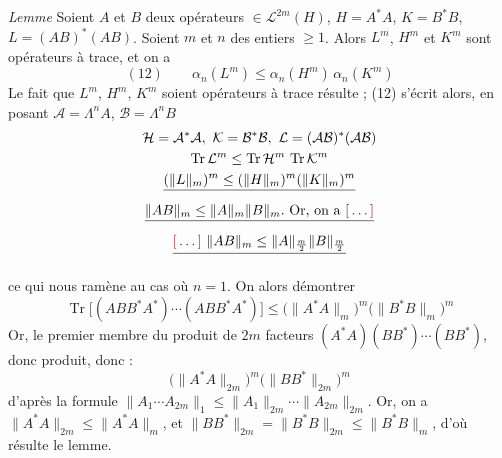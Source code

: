 \documentclass[11pt,a4paper]{article}
\begin{document}
\emph{Lemme} Soient $A$ et $B$ deux opérateurs $\in \mathcal{L}^{2m}(H)$,  $H = A^*A$, $K = B^*B$, $L = (AB)^*(AB)$. Soient  $m$ et $n$ des entiers $\geq 1$. Alors  $L^m$, $H^m$ et $K^m$  sont opérateurs à trace, et on a
\[
  (12)\qquad \alpha_n(L^m) \leq \alpha_n(H^m)\, \alpha_n(K^m)
\]
Le fait que $L^m$, $H^m$, $K^m$ soient opérateurs à trace résulte  \ill{}     ;    (12) s'écrit alors,  en posant $\mathcal{A} = \Lambda^n A$, $\mathcal{B} = \Lambda^n B$  
\begin{gather*}
  \mathcal{H} = \mathcal{A}^*\mathcal{A},\ \mathcal{K} = \mathcal{B}^*\mathcal{B},\ \mathcal{L} = (\mathcal{A}\mathcal{B})^*(\mathcal{A}\mathcal{B}) \\
  \operatorname{Tr} \mathcal{L}^m \leq \operatorname{Tr} \mathcal{H}^m\, \operatorname{Tr} \mathcal{K}^m \\
  \struck{(\|L\|_m)^m \leq (\|H\|_m)^m (\|K\|_m)^m} \\
  \struck{\|AB\|_m \leq \|A\|_m \|B\|_m.\ \text{Or, on a}\ \ill{}} \\
  \struck{\ill{}\ \|AB\|_m \leq \|A\|_{\frac m2} \|B\|_{\frac m2}}
\end{gather*}

 ce qui nous ramène au cas où $n = 1$. On  alors démontrer
\[
  \operatorname{Tr}\bigl[(ABB^*A^*) \cdots (ABB^*A^*)\bigr] \leq \bigl(\|A^*A\|_m\bigr)^m \bigl(\|B^*B\|_m\bigr)^m
\]
 Or, le premier membre      du produit de $2m$ facteurs  $(A^*A)(BB^*)\cdots(BB^*)$, donc        produit, donc     :
\[
  \bigl(\|A^*A\|_{2m}\bigr)^m \bigl(\|BB^*\|_{2m}\bigr)^m
\]
d'après la formule $\|A_1 \cdots A_{2m}\|_1 \leq \|A_1\|_{2m} \cdots \|A_{2m}\|_{2m}$. Or, on a $\|A^*A\|_{2m} \leq \|A^*A\|_m$, et $\|BB^*\|_{2m} = \|B^*B\|_{2m} \leq \|B^*B\|_m$, d'où résulte le lemme.
\end{document}
